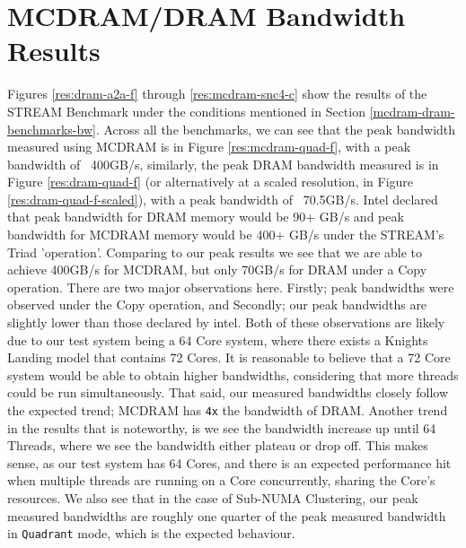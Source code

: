 \documentclass[bsc,frontabs,twoside,singlespacing,parskip,deptreport]{infthesis}     %
\begin{document}
\section{MCDRAM/DRAM Bandwidth Results}
Figures \ref{res:dram-a2a-f} through \ref{res:mcdram-snc4-c} show the results of the STREAM\cite{STREAM} Benchmark under the conditions mentioned in Section \ref{mcdram-dram-benchmarks-bw}. Across all the benchmarks, we can see that the peak bandwidth measured using MCDRAM is in Figure \ref{res:mcdram-quad-f}, with a peak bandwidth of ~400GB/s, similarly, the peak DRAM bandwidth measured is in Figure \ref{res:dram-quad-f} (or alternatively at a scaled resolution, in Figure \ref{res:dram-quad-f-scaled}), with a peak bandwidth of ~70.5GB/s. Intel declared\cite{intel_pres} that peak bandwidth for DRAM memory would be 90+ GB/s and peak bandwidth for MCDRAM memory would be 400+ GB/s under the STREAM's Triad 'operation'. Comparing to our peak results we see that we are able to achieve 400GB/s for MCDRAM, but only 70GB/s for DRAM under a Copy operation. There are two major observations here. Firstly; peak bandwidths were observed under the Copy operation, and Secondly; our peak bandwidths are slightly lower than those declared by intel. Both of these observations are likely due to our test system being a 64 Core system, where there exists a Knights Landing model that contains 72 Cores. It is reasonable to believe that a 72 Core system would be able to obtain higher bandwidths, considering that more threads could be run simultaneously. That said, our measured bandwidths closely follow the expected trend; MCDRAM has \texttt{4x} the bandwidth of DRAM. Another trend in the results that is noteworthy, is we see the bandwidth increase up until 64 Threads, where we see the bandwidth either plateau or drop off. This makes sense, as our test system has 64 Cores, and there is an expected performance hit when multiple threads are running on a Core concurrently, sharing the Core's resources. We also see that in the case of Sub-NUMA Clustering, our peak measured bandwidths are roughly one quarter of the peak measured bandwidth in \texttt{Quadrant} mode, which is the expected behaviour.
\end{document}
